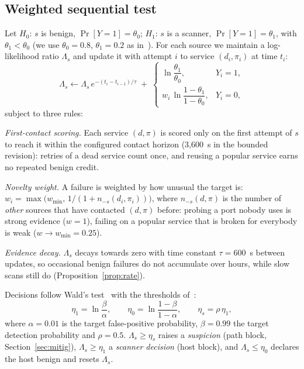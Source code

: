 \documentclass[conference]{IEEEtran}
\begin{document}
\subsection{Weighted sequential test}
Let $H_0$: $s$ is benign, $\Pr[Y=1]=\theta_0$; $H_1$: $s$ is a scanner, $\Pr[Y=1]=\theta_1$, with $\theta_1<\theta_0$
(we use $\theta_0=0.8$, $\theta_1=0.2$ as in~\cite{jung2004trw}). For each source we maintain a log-likelihood ratio
$\Lambda_s$ and update it with attempt $i$ to service $(d_i,\pi_i)$ at time $t_i$:
\begin{equation}\label{eq:update}
\Lambda_s \leftarrow \Lambda_s\, e^{-(t_i-t_{i-1})/\tau} \;+\;
\begin{cases} \ln\dfrac{\theta_1}{\theta_0}, & Y_i=1,\\[2mm] w_i\,\ln\dfrac{1-\theta_1}{1-\theta_0}, & Y_i=0,\end{cases}
\end{equation}
subject to three rules:

\emph{First-contact scoring.} Each service $(d,\pi)$ is scored only on the first attempt of $s$ to reach it within
the configured contact horizon (3,600~s in the bounded revision):
retries of a dead service count once, and reusing a popular service earns no repeated benign credit.

\emph{Novelty weight.} A failure is weighted by how unusual the target is:
$w_i = \max\!\big(w_{\min},\, 1/(1+n_{-s}(d_i,\pi_i))\big)$, where $n_{-s}(d,\pi)$ is the number of \emph{other} sources
that have contacted $(d,\pi)$ before: probing a port nobody uses is strong evidence ($w=1$), failing on a popular service
that is broken for everybody is weak ($w\to w_{\min}=0.25$).

\emph{Evidence decay.} $\Lambda_s$ decays towards zero with time constant $\tau=600$~s between updates, so occasional
benign failures do not accumulate over hours, while slow scans still do (Proposition~\ref{prop:rate}).

Decisions follow Wald's test~\cite{wald1945sequential} with the thresholds of~\cite{jung2004trw}:
\begin{equation}\label{eq:thresholds}
\eta_1=\ln\frac{\beta}{\alpha},\qquad \eta_0=\ln\frac{1-\beta}{1-\alpha},\qquad \eta_s=\rho\,\eta_1,
\end{equation}
where $\alpha=0.01$ is the target false-positive probability, $\beta=0.99$ the target detection probability and
$\rho=0.5$. $\Lambda_s\ge\eta_s$ raises a \emph{suspicion} (path block, Section~\ref{sec:mitig}), $\Lambda_s\ge\eta_1$ a
\emph{scanner decision} (host block), and $\Lambda_s\le\eta_0$ declares the host benign and resets $\Lambda_s$.
\end{document}
